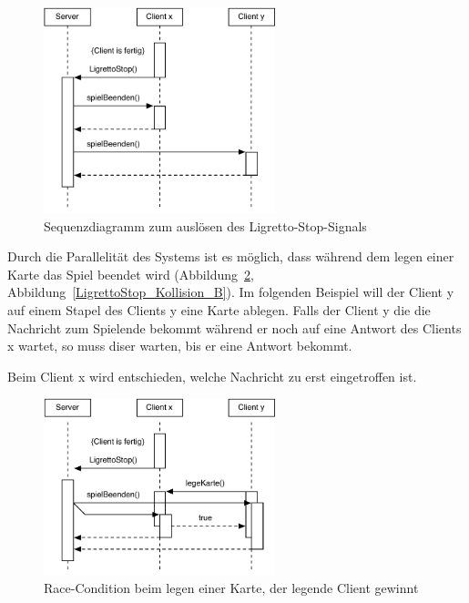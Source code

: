 \begin{figure}[H]
  \centering
  \includegraphics[width=0.60\textwidth,angle=0]{graphics/LigrettoStop.pdf}
  \caption{Sequenzdiagramm zum auslösen des Ligretto-Stop-Signals\hfill{} }
  \label{LigrettoStop}
\end{figure}

Durch die Parallelität des Systems ist es möglich, dass während dem legen einer Karte das Spiel beendet wird (Abbildung~\ref{LigrettoStop_Kollision_A}, Abbildung~\ref{LigrettoStop_Kollision_B}). Im folgenden Beispiel will der Client y auf einem Stapel des Clients y eine Karte ablegen. Falls der Client y die die Nachricht zum Spielende bekommt während er noch auf eine Antwort des Clients x wartet, so muss diser warten, bis er eine Antwort bekommt.

Beim Client x wird entschieden, welche Nachricht zu erst eingetroffen ist.

\begin{figure}[H]
  \centering
  \includegraphics[width=0.60\textwidth,angle=0]{graphics/LigrettoStop_Kollision_A.pdf}
  \caption{Race-Condition beim legen einer Karte, der legende Client gewinnt\hfill{} }
  \label{LigrettoStop_Kollision_A}
\end{figure}


